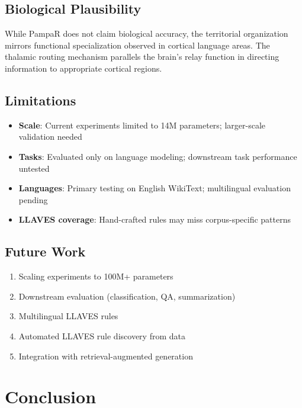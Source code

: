 \documentclass[11pt,a4paper]{article}
\begin{document}
\subsection{Biological Plausibility}

While PampaR does not claim biological accuracy, the territorial organization mirrors functional specialization observed in cortical language areas. The thalamic routing mechanism parallels the brain's relay function in directing information to appropriate cortical regions.

\subsection{Limitations}

\begin{itemize}
    \item \textbf{Scale}: Current experiments limited to 14M parameters; larger-scale validation needed
    \item \textbf{Tasks}: Evaluated only on language modeling; downstream task performance untested
    \item \textbf{Languages}: Primary testing on English WikiText; multilingual evaluation pending
    \item \textbf{LLAVES coverage}: Hand-crafted rules may miss corpus-specific patterns
\end{itemize}

\subsection{Future Work}

\begin{enumerate}
    \item Scaling experiments to 100M+ parameters
    \item Downstream evaluation (classification, QA, summarization)
    \item Multilingual LLAVES rules
    \item Automated LLAVES rule discovery from data
    \item Integration with retrieval-augmented generation
\end{enumerate}

\section{Conclusion}
\label{sec:conclusion}
\end{document}
